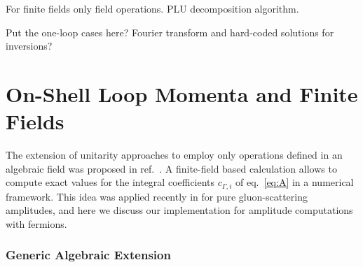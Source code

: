 For finite fields only field operations. PLU decomposition algorithm.

Put the one-loop cases here? Fourier transform and hard-coded solutions for inversions?

\section{On-Shell Loop Momenta and Finite Fields}
\label{sec:muij_square_roots}
The extension of unitarity approaches to employ only operations
defined in an algebraic field was proposed 
in ref.~\cite{Peraro:2016wsq}.
A finite-field based calculation allows to compute exact values
for the integral coefficients $c_{\Gamma,i}$ of eq.~\eqref{eq:A}
in a numerical framework.
This idea
was applied recently in \cite{Badger:2017jhb,Abreu:2017hqn} for
pure gluon-scattering amplitudes, and here we discuss our
implementation for amplitude computations with fermions.

\subsubsection{Generic Algebraic Extension}

